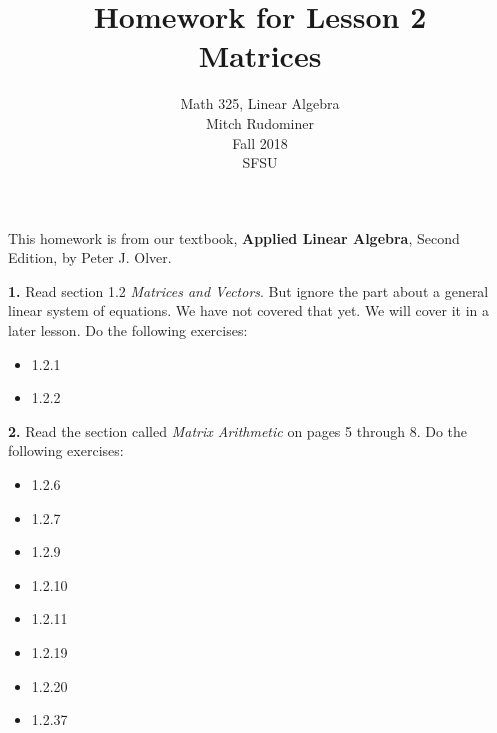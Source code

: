 \documentclass[oneside,12pt]{amsart}
\begin{document}
\title{Homework for Lesson 2 \\ Matrices}
\author{Math 325, Linear Algebra \\ Mitch Rudominer \\ Fall 2018 \\ SFSU }
\date{}

\maketitle

This homework is from our textbook,
\textbf{Applied Linear Algebra}, Second Edition, by Peter J. Olver.

\bigskip

\textbf{1.} Read section 1.2 \emph{Matrices and Vectors}. But ignore the part
about a general linear system of equations. We have not covered that yet.
We will cover it in a later lesson. Do the following exercises:
\begin{itemize}
\item 1.2.1
\item 1.2.2
\end{itemize}


\bigskip

\textbf{2.} Read the section called \emph{Matrix Arithmetic} on pages 5 through
8. Do the following exercises:
\begin{itemize}
\item 1.2.6
\item 1.2.7
\item 1.2.9
\item 1.2.10
\item 1.2.11
\item 1.2.19
\item 1.2.20
\item 1.2.37
\end{itemize}
\end{document}
